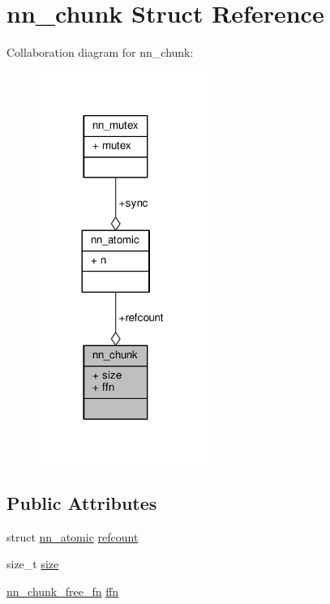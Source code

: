 \hypertarget{structnn__chunk}{}\section{nn\+\_\+chunk Struct Reference}
\label{structnn__chunk}


Collaboration diagram for nn\+\_\+chunk\+:\nopagebreak
\begin{figure}[H]
\begin{center}
\leavevmode
\includegraphics[width=156pt]{structnn__chunk__coll__graph}
\end{center}
\end{figure}
\subsection*{Public Attributes}
\begin{DoxyCompactItemize}
\item 
struct \hyperlink{structnn__atomic}{nn\+\_\+atomic} \hyperlink{structnn__chunk_a6d263535f4104d1e02e1b0e0b04e667c}{refcount}
\item 
size\+\_\+t \hyperlink{structnn__chunk_abf9a2795a02f86a19fe3db0db0a21106}{size}
\item 
\hyperlink{chunk_8c_a791a602d30b50b3a5637005123c7336d}{nn\+\_\+chunk\+\_\+free\+\_\+fn} \hyperlink{structnn__chunk_a902d9aa3b995457231f2e9e5694e93f3}{ffn}
\end{DoxyCompactItemize}


